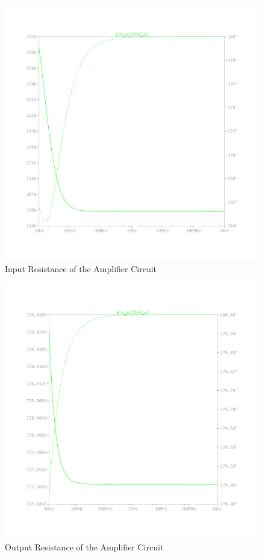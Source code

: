 \documentclass{article}
\begin{document}
\begin{figure}[H]
    \centering
    \includegraphics[height=0.4\textheight,trim={30mm 30mm 30mm 30mm}]{img/Amplifier Design Input Resistance.pdf}
    \caption{Input Resistance of the Amplifier Circuit}
    \label{fig:ac-input-res}
\end{figure}

\begin{figure}[H]
    \centering
    \includegraphics[height=0.4\textheight,trim={30mm 30mm 30mm 30mm}]{img/Amplifier Design Output Resistance.pdf}
    \caption{Output Resistance of the Amplifier Circuit}
    \label{fig:ac-output-res}
\end{figure}
\end{document}
